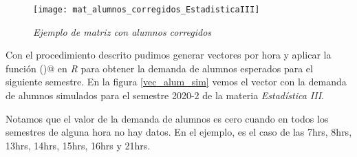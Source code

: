 
\begin{figure}[H]
\centering
\texttt{[image: mat\_alumnos\_corregidos\_EstadisticaIII]} %
\caption{\textit{Ejemplo de matriz con alumnos corregidos}}\label{matAl_corregidos}
\end{figure}

Con el procedimiento descrito pudimos generar vectores por hora y aplicar la función \verb@hw()@ en \textit{R} para obtener la demanda de alumnos esperados para el siguiente semestre. En la figura \ref{vec_alum_sim} vemos el vector con la demanda de alumnos simulados para el semestre 2020-2 de la materia \textit{Estadística III}.

Notamos que el valor de la demanda de alumnos es cero cuando en todos los semestres de alguna hora no hay datos. En el ejemplo, es el caso de las 7hrs, 8hrs, 13hrs, 14hrs, 15hrs, 16hrs y 21hrs.

